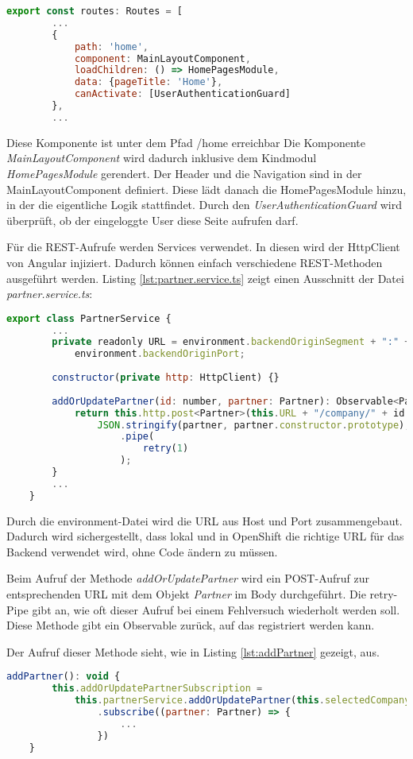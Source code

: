 \begin{lstlisting}[language=JavaScript, caption={app-routing.module.ts}, label={lst:app-routing.module.ts}]
	export const routes: Routes = [
		...
		{
			path: 'home',
			component: MainLayoutComponent,
			loadChildren: () => HomePagesModule,
			data: {pageTitle: 'Home'},
			canActivate: [UserAuthenticationGuard]
		},
		...
\end{lstlisting}
Diese Komponente ist unter dem Pfad \glqq /home\grqq{} erreichbar Die Komponente \textit{MainLayoutComponent} wird dadurch inklusive dem Kindmodul \textit{HomePagesModule} gerendert. Der Header und die Navigation sind in der MainLayoutComponent definiert. Diese lädt danach die HomePagesModule hinzu, in der die eigentliche Logik stattfindet. Durch den \textit{UserAuthenticationGuard} wird überprüft, ob der eingeloggte User diese Seite aufrufen darf.

Für die REST-Aufrufe werden Services verwendet. In diesen wird der HttpClient von Angular injiziert. Dadurch können einfach verschiedene REST-Methoden ausgeführt werden.
Listing \ref{lst:partner.service.ts} zeigt einen Ausschnitt der Datei \textit{partner.service.ts}:

\begin{lstlisting}[language=JavaScript, caption={partner.service.ts}, label={lst:partner.service.ts}]
	export class PartnerService {
		...
		private readonly URL = environment.backendOriginSegment + ":" +
			environment.backendOriginPort;
		
		constructor(private http: HttpClient) {}
	
		addOrUpdatePartner(id: number, partner: Partner): Observable<Partner> {
			return this.http.post<Partner>(this.URL + "/company/" + id + "/partner",
				JSON.stringify(partner, partner.constructor.prototype),
					.pipe(
						retry(1)
					);
		}
		...
	}
\end{lstlisting}
Durch die environment-Datei wird die URL aus Host und Port zusammengebaut. Dadurch wird sichergestellt, dass lokal und in OpenShift die richtige URL für das Backend verwendet wird, ohne Code ändern zu müssen.

Beim Aufruf der Methode \textit{addOrUpdatePartner} wird ein POST-Aufruf zur entsprechenden URL mit dem Objekt \textit{Partner} im Body durchgeführt. Die retry-Pipe gibt an, wie oft dieser Aufruf bei einem Fehlversuch wiederholt werden soll. Diese Methode gibt ein Observable zurück, auf das registriert werden kann. 

Der Aufruf dieser Methode sieht, wie in Listing \ref{lst:addPartner} gezeigt, aus.
\begin{lstlisting}[language=JavaScript, caption={addPartner-Methode}, label={lst:addPartner}]
	addPartner(): void {
		this.addOrUpdatePartnerSubscription = 
			this.partnerService.addOrUpdatePartner(this.selectedCompany.id, this.partner)
				.subscribe((partner: Partner) => {
					...
				})
	}
\end{lstlisting}

